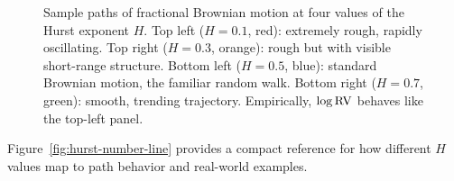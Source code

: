 \begin{figure}[htbp]
\caption{Sample paths of fractional Brownian motion at four values of the Hurst exponent $H$.
Top left ($H = 0.1$, red): extremely rough, rapidly oscillating.
Top right ($H = 0.3$, orange): rough but with visible short-range structure.
Bottom left ($H = 0.5$, blue): standard Brownian motion, the familiar random walk.
Bottom right ($H = 0.7$, green): smooth, trending trajectory.
Empirically, $\log \operatorname{RV}$ behaves like the top-left panel.}
\label{fig:hurst-paths}
\end{figure}

Figure~\ref{fig:hurst-number-line} provides a compact reference for how different $H$ values map to path behavior and real-world examples.

